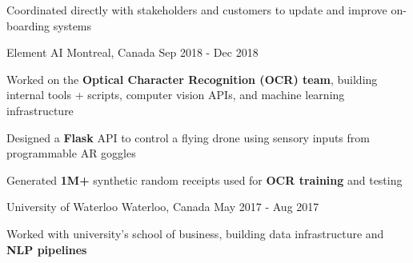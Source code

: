 \documentclass[11pt, a4paper]{awesome-cv}
\begin{document}
\begin{siderules1}
\begin{cventries}
{\begin{cvitems}
        \item {Coordinated directly with stakeholders and customers to update and improve on-boarding systems}
      \end{cvitems}
    }
    \cventry
    {\textit{}}
    {Element AI}
    {Montreal, Canada}
    {Sep 2018 - Dec 2018}
    {
      \begin{cvitems}
        \item {Worked on the \textbf{Optical Character Recognition (OCR) team}, building internal tools + scripts, computer vision APIs, and machine learning infrastructure}
        \item {Designed a \textbf{Flask} API to control a flying drone using sensory inputs from programmable AR goggles}
        \item {Generated \textbf{1M+} synthetic random receipts used for \textbf{OCR training} and testing}
      \end{cvitems}
    }
  \cventry
    {\textit{}}
    {University of Waterloo}
    {Waterloo, Canada}
    {May 2017 - Aug 2017}
    {
      \begin{cvitems}
        \item {Worked with university's school of business, building data infrastructure and \textbf{NLP pipelines}}
      \end{cvitems}
    }
\end{cventries}
\end{siderules1}
\end{document}
